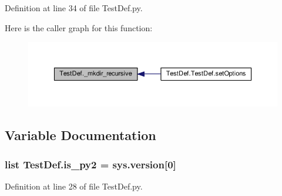 Definition at line 34 of file Test\-Def.\-py.



Here is the caller graph for this function\-:
\nopagebreak
\begin{figure}[H]
\begin{center}
\leavevmode
\includegraphics[width=350pt]{namespaceTestDef_a0f44619ec0fe932324e50d8cf706d647_icgraph}
\end{center}
\end{figure}




\subsection{Variable Documentation}
\hypertarget{namespaceTestDef_a4e87724b7a6a117c2cca22c557936868}{
\subsubsection[{is\-\_\-py2}]{\setlength{\rightskip}{0pt plus 5cm}list Test\-Def.\-is\-\_\-py2 = sys.\-version\mbox{[}0\mbox{]}}}\label{namespaceTestDef_a4e87724b7a6a117c2cca22c557936868}


Definition at line 28 of file Test\-Def.\-py.

